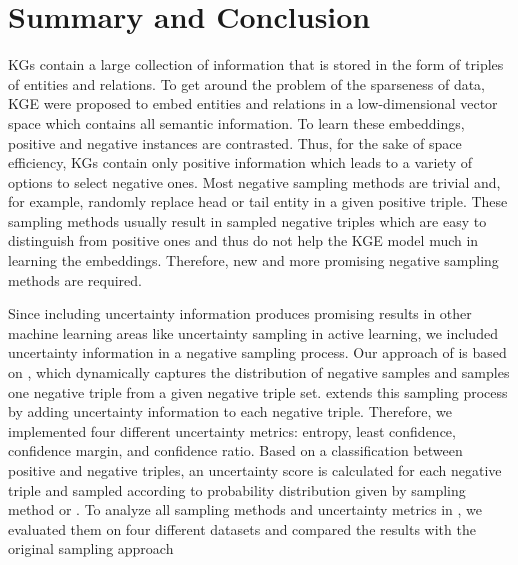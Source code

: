 \section{Summary and Conclusion}  
\label{sec:summary_and_conclusion}
\acp{KG} contain a large collection of information that is stored in the form of triples of entities and relations.
To get around the problem of the sparseness of data, \ac{KGE} were proposed to embed entities and relations in a low-dimensional vector space which contains all semantic information.
To learn these embeddings, positive and negative instances are contrasted.
Thus, for the sake of space efficiency, \acp{KG} contain only positive information which leads to a variety of options to select negative ones.
Most negative sampling methods are trivial and, for example, randomly replace head or tail entity in a given positive triple.
These sampling methods usually result in sampled negative triples which are easy to distinguish from positive ones and thus do not help the \ac{KGE} model much in learning the embeddings. 
Therefore, new and more promising negative sampling methods are required.

Since including uncertainty information produces promising results in other machine learning areas like uncertainty sampling in active learning, we included uncertainty information in a negative sampling process.
Our approach of \usgan is based on \kbgan, which dynamically captures the distribution of negative samples and samples one negative triple from a given negative triple set.
\usgan extends this sampling process by adding uncertainty information to each negative triple.
Therefore, we implemented four different uncertainty metrics: entropy, least confidence, confidence margin, and confidence ratio.
Based on a classification between positive and negative triples, an uncertainty score is calculated for each negative triple and sampled according to probability distribution given by sampling method \ussoftmax or \usmax.
To analyze all sampling methods and uncertainty metrics in \usgan, we evaluated them on four different datasets and compared the results with the original \kbgan sampling approach 


